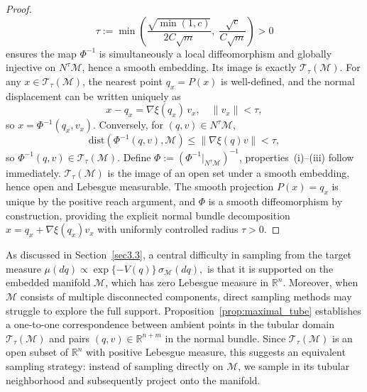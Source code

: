 \documentclass[12pt]{article}
\begin{document}
\begin{proof}
\begin{equation}\nonumber
    \tau := \min\!\left(\frac{\sqrt{\min(1,c)}}{2C\sqrt{m}},\; \frac{\sqrt{c}}{C\sqrt{m}}\right) > 0
\end{equation}
ensures the map $\Phi^{-1}$ is simultaneously a local diffeomorphism and globally injective on
$N^\tau\mathcal{M}$, hence a smooth embedding. Its image is exactly $\mathcal{T}_\tau(\mathcal{M})$.
For any $x \in \mathcal{T}_\tau(\mathcal{M})$, the nearest point $q_x = P(x)$ is well-defined, and the normal displacement can be written uniquely as
\[
x - q_x = \nabla \xi(q_x)\, v_x, \quad \|v_x\| < \tau,
\]
so $x = \Phi^{-1}(q_x, v_x)$. Conversely, for $(q,v)\in N^\tau\mathcal{M}$,
\[
\mathrm{dist}(\Phi^{-1}(q,v),\mathcal{M}) \le \|\nabla\xi(q)v\| < \tau,
\]
so $\Phi^{-1}(q,v)\in \mathcal{T}_\tau(\mathcal{M})$.
Define
$\Phi := (\Phi^{-1}|_{N^\tau\mathcal{M}})^{-1}$, properties~(i)--(iii) follow immediately.
$\mathcal{T}_\tau(\mathcal{M})$ is the image of an open set under a smooth embedding, hence open
and Lebesgue measurable. The smooth projection $P(x) = q_x$ is unique by the positive reach
argument, and $\Phi$ is a smooth diffeomorphism by construction, providing the explicit normal
bundle decomposition $x = q_x + \nabla\xi(q_x)v_x$ with uniformly controlled radius $\tau > 0$.
\end{proof}
As discussed in Section~\ref{sec3.3}, a central difficulty in sampling from
the target measure
\(
\mu(dq) \propto \exp\{-V(q)\}\,\sigma_{\mathcal M}(dq),
\)
is that it is supported on the embedded manifold $\mathcal M$,
which has zero Lebesgue measure in $\mathbb R^n$.
Moreover, when $\mathcal M$ consists of multiple disconnected components,
direct sampling methods may struggle to explore the full support.
Proposition~\ref{prop:maximal_tube} establishes a one-to-one
correspondence between ambient points in the tubular domain
$\mathcal T_\tau(\mathcal M)$ and pairs $(q,v)\in\mathbb R^{n+m}$ in the normal bundle.
Since $\mathcal T_\tau(\mathcal M)$ is an open subset of $\mathbb R^n$
with positive Lebesgue measure,
this suggests an equivalent sampling strategy:
instead of sampling directly on $\mathcal M$,
we sample in its tubular neighborhood and subsequently project onto the manifold. 
\end{document}
